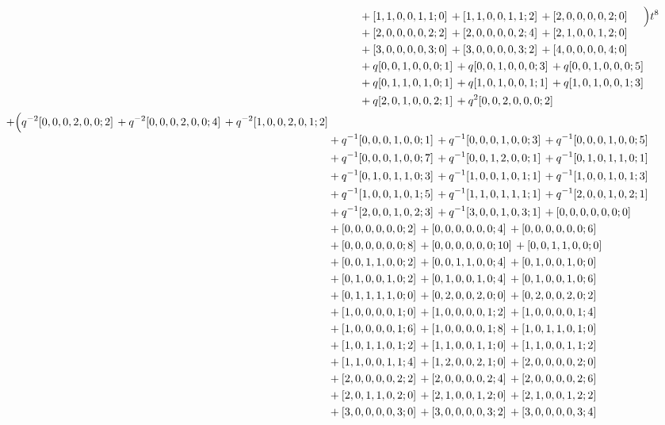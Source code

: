 \documentclass[10pt]{article}
\begin{document}
\[\begin{aligned}
\begin{aligned}[t]
  &{}+[1,1,0,0,1,1;0]\,+[1,1,0,0,1,1;2]\,+[2,0,0,0,0,2;0] \\
  &{}+[2,0,0,0,0,2;2]\,+[2,0,0,0,0,2;4]\,+[2,1,0,0,1,2;0] \\
  &{}+[3,0,0,0,0,3;0]\,+[3,0,0,0,0,3;2]\,+[4,0,0,0,0,4;0] \\
  &{}+q[0,0,1,0,0,0;1]\,+q[0,0,1,0,0,0;3]\,+q[0,0,1,0,0,0;5] \\
  &{}+q[0,1,1,0,1,0;1]\,+q[1,0,1,0,0,1;1]\,+q[1,0,1,0,0,1;3] \\
  &{}+q[2,0,1,0,0,2;1]\,+q^{2}[0,0,2,0,0,0;2]\end{aligned}\Bigr)t^{8} \\
  + \Bigl(\begin{aligned}[t]q^{-2}[0,0,0,2,0,0;2]\,+q^{-2}[0,0,0,2,0,0;4]\,+q^{-2}[1,0,0,2,0,1;2] \\
  &{}+q^{-1}[0,0,0,1,0,0;1]\,+q^{-1}[0,0,0,1,0,0;3]\,+q^{-1}[0,0,0,1,0,0;5] \\
  &{}+q^{-1}[0,0,0,1,0,0;7]\,+q^{-1}[0,0,1,2,0,0;1]\,+q^{-1}[0,1,0,1,1,0;1] \\
  &{}+q^{-1}[0,1,0,1,1,0;3]\,+q^{-1}[1,0,0,1,0,1;1]\,+q^{-1}[1,0,0,1,0,1;3] \\
  &{}+q^{-1}[1,0,0,1,0,1;5]\,+q^{-1}[1,1,0,1,1,1;1]\,+q^{-1}[2,0,0,1,0,2;1] \\
  &{}+q^{-1}[2,0,0,1,0,2;3]\,+q^{-1}[3,0,0,1,0,3;1]\,+[0,0,0,0,0,0;0] \\
  &{}+[0,0,0,0,0,0;2]\,+[0,0,0,0,0,0;4]\,+[0,0,0,0,0,0;6] \\
  &{}+[0,0,0,0,0,0;8]\,+[0,0,0,0,0,0;10]\,+[0,0,1,1,0,0;0] \\
  &{}+[0,0,1,1,0,0;2]\,+[0,0,1,1,0,0;4]\,+[0,1,0,0,1,0;0] \\
  &{}+[0,1,0,0,1,0;2]\,+[0,1,0,0,1,0;4]\,+[0,1,0,0,1,0;6] \\
  &{}+[0,1,1,1,1,0;0]\,+[0,2,0,0,2,0;0]\,+[0,2,0,0,2,0;2] \\
  &{}+[1,0,0,0,0,1;0]\,+[1,0,0,0,0,1;2]\,+[1,0,0,0,0,1;4] \\
  &{}+[1,0,0,0,0,1;6]\,+[1,0,0,0,0,1;8]\,+[1,0,1,1,0,1;0] \\
  &{}+[1,0,1,1,0,1;2]\,+[1,1,0,0,1,1;0]\,+[1,1,0,0,1,1;2] \\
  &{}+[1,1,0,0,1,1;4]\,+[1,2,0,0,2,1;0]\,+[2,0,0,0,0,2;0] \\
  &{}+[2,0,0,0,0,2;2]\,+[2,0,0,0,0,2;4]\,+[2,0,0,0,0,2;6] \\
  &{}+[2,0,1,1,0,2;0]\,+[2,1,0,0,1,2;0]\,+[2,1,0,0,1,2;2] \\
  &{}+[3,0,0,0,0,3;0]\,+[3,0,0,0,0,3;2]\,+[3,0,0,0,0,3;4] \\

\end{aligned}
\end{aligned}\]
\end{document}
